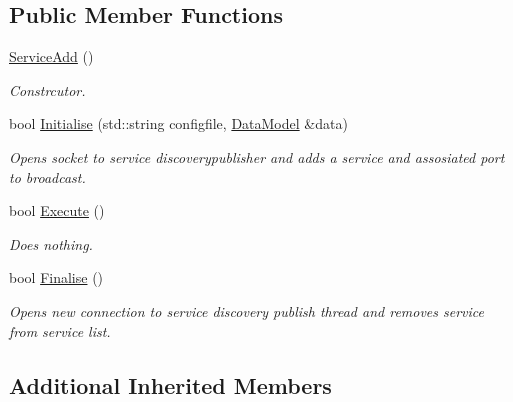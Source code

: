 \subsection*{Public Member Functions}
\begin{DoxyCompactItemize}
\item 
\hypertarget{classServiceAdd_a0148b0e038f4b0dd6f12c87cdf233f69}{\hyperlink{classServiceAdd_a0148b0e038f4b0dd6f12c87cdf233f69}{Service\-Add} ()}\label{classServiceAdd_a0148b0e038f4b0dd6f12c87cdf233f69}

\begin{DoxyCompactList}\small\item\em Constrcutor. \end{DoxyCompactList}\item 
\hypertarget{classServiceAdd_a047e44c3d209591703b0bdec1b1b51cd}{bool \hyperlink{classServiceAdd_a047e44c3d209591703b0bdec1b1b51cd}{Initialise} (std\-::string configfile, \hyperlink{classDataModel}{Data\-Model} \&data)}\label{classServiceAdd_a047e44c3d209591703b0bdec1b1b51cd}

\begin{DoxyCompactList}\small\item\em Opens socket to service discoverypublisher and adds a service and assosiated port to broadcast. \end{DoxyCompactList}\item 
\hypertarget{classServiceAdd_a4908df063074b02e73e589d9f07998ac}{bool \hyperlink{classServiceAdd_a4908df063074b02e73e589d9f07998ac}{Execute} ()}\label{classServiceAdd_a4908df063074b02e73e589d9f07998ac}

\begin{DoxyCompactList}\small\item\em Does nothing. \end{DoxyCompactList}\item 
\hypertarget{classServiceAdd_a2e4d3854bcd490935e6e9d39597c7204}{bool \hyperlink{classServiceAdd_a2e4d3854bcd490935e6e9d39597c7204}{Finalise} ()}\label{classServiceAdd_a2e4d3854bcd490935e6e9d39597c7204}

\begin{DoxyCompactList}\small\item\em Opens new connection to service discovery publish thread and removes service from service list. \end{DoxyCompactList}\end{DoxyCompactItemize}
\subsection*{Additional Inherited Members}


